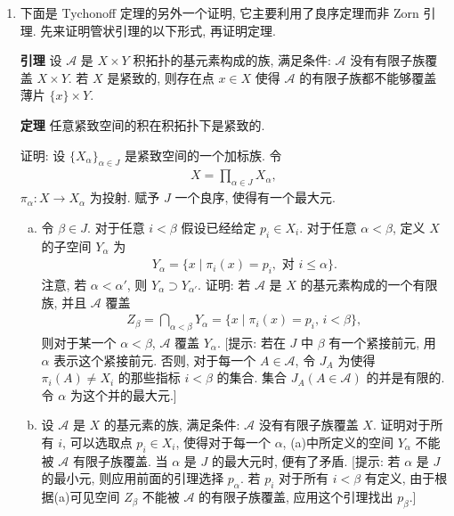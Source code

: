 \documentclass[../../main.tex]{subfiles}
\begin{document}
\begin{enumerate}
\textbf{定理} 设 $X$ 是紧致的 Hausdorff 空间, 则 $x$ 和 $y$ 属于 $X$ 的同一拟连通分支当且仅当它们属于 $X$ 的同一分支.
\begin{enumerate}[(a)]
\item 令 $\mathcal{A}$ 为 $X$ 的闭子空间的族, 满足条件: 对于每一个 $A\in\mathcal{A}$, $x,y$ 在 $A$ 的同一拟连通分支中. 令 $\mathcal{B}$ 为 $\mathcal{A}$ 的一个子族, 在真包含关系下是全序集. 证明 $\mathcal{B}$ 的所有元素的交属于 $\mathcal{A}$. [提示: 与第 26 节的练习 11 比较.]
\item 证明 $\mathcal{A}$ 有极小元 $D$.
\item 证明 $D$ 是连通的.
\end{enumerate}
\item 下面是 Tychonoff 定理的另外一个证明, 它主要利用了良序定理而非 Zorn 引理. 先来证明管状引理的以下形式, 再证明定理.

\textbf{引理} 设 $\mathcal{A}$ 是 $X\times Y$ 积拓扑的基元素构成的族, 满足条件: $\mathcal{A}$ 没有有限子族覆盖 $X\times Y$. 若 $X$ 是紧致的, 则存在点 $x\in X$ 使得 $\mathcal{A}$ 的有限子族都不能够覆盖薄片 $\{x\}\times Y$.

\textbf{定理} 任意紧致空间的积在积拓扑下是紧致的.

证明: 设 $\{X_\alpha\}_{\alpha\in J}$ 是紧致空间的一个加标族. 令
\begin{align*}
X=\prod_{\alpha\in J}X_\alpha,
\end{align*}
$\pi_\alpha\colon X\to X_\alpha$ 为投射. 赋予 $J$ 一个良序, 使得有一个最大元.
\begin{enumerate}[(a)]
\item 令 $\beta\in J$. 对于任意 $i<\beta$ 假设已经给定 $p_i\in X_i$. 对于任意 $\alpha<\beta$, 定义 $X$ 的子空间 $Y_\alpha$ 为
\begin{align*}
Y_\alpha=\{x\mid \pi_i(x)=p_i,\text{ 对 }i\leqslant\alpha\}.
\end{align*}
注意, 若 $\alpha<\alpha'$, 则 $Y_\alpha\supset Y_{\alpha'}$. 证明: 若 $\mathcal{A}$ 是 $X$ 的基元素构成的一个有限族, 并且 $\mathcal{A}$ 覆盖
\begin{align*}
Z_\beta=\bigcap_{\alpha<\beta}Y_\alpha=\{x\mid \pi_i(x)=p_i,\,i<\beta\},
\end{align*}
则对于某一个 $\alpha<\beta$, $\mathcal{A}$ 覆盖 $Y_\alpha$. [提示: 若在 $J$ 中 $\beta$ 有一个紧接前元, 用 $\alpha$ 表示这个紧接前元. 否则, 对于每一个 $A\in\mathcal{A}$, 令 $J_A$ 为使得 $\pi_i(A)\neq X_i$ 的那些指标 $i<\beta$ 的集合. 集合 $J_A(A\in\mathcal{A})$ 的并是有限的. 令 $\alpha$ 为这个并的最大元.]
\item 设 $\mathcal{A}$ 是 $X$ 的基元素的族, 满足条件: $\mathcal{A}$ 没有有限子族覆盖 $X$. 证明对于所有 $i$, 可以选取点 $p_i\in X_i$, 使得对于每一个 $\alpha$, (a)中所定义的空间 $Y_\alpha$ 不能被 $\mathcal{A}$ 有限子族覆盖. 当 $\alpha$ 是 $J$ 的最大元时, 便有了矛盾. [提示: 若 $\alpha$ 是 $J$ 的最小元, 则应用前面的引理选择 $p_\alpha$. 若 $p_i$ 对于所有 $i<\beta$ 有定义, 由于根据(a)可见空间 $Z_\beta$ 不能被 $\mathcal{A}$ 的有限子族覆盖, 应用这个引理找出 $p_\beta$.]
\end{enumerate}
\end{enumerate}
\end{document}
